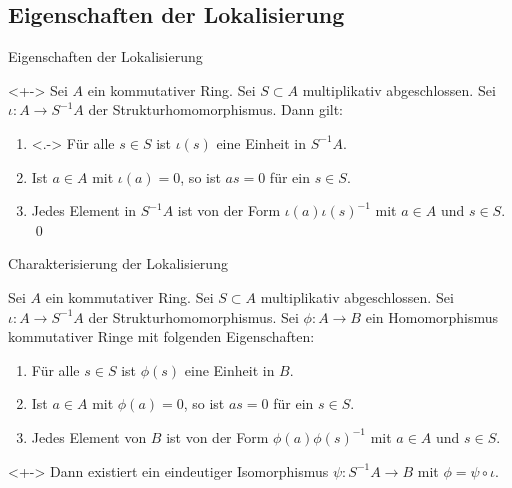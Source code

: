\subsection{Eigenschaften der Lokalisierung}

\begin{frame}{Eigenschaften der Lokalisierung}
	\begin{proposition}<+->
		Sei \(A\) ein kommutativer Ring. Sei \(S \subset A\) multiplikativ abgeschlossen. Sei \(\iota\colon A \to S^{-1} A\)
		der Strukturhomomorphismus. Dann gilt:
		\begin{enumerate}[<+->]
		\item<.->
			Für alle \(s \in S\) ist \(\iota(s)\) eine Einheit in \(S^{-1} A\).
		\item
			Ist \(a \in A\) mit \(\iota(a) = 0\), so ist \(a s = 0\) für ein \(s \in S\).
		\item
			Jedes Element in \(S^{-1} A\) ist von der Form \(\iota(a) \iota(s)^{-1}\) mit \(a \in A\) und \(s \in S\).
			\qed
		\end{enumerate}
	\end{proposition}
\end{frame}

\begin{frame}{Charakterisierung der Lokalisierung}
	\begin{corollary}
		Sei \(A\) ein kommutativer Ring. Sei \(S \subset A\) multiplikativ abgeschlossen.
		Sei \(\iota\colon A \to S^{-1} A\) der Strukturhomomorphismus.
		Sei \(\phi\colon A \to B\) ein Homomorphismus kommutativer Ringe mit folgenden Eigenschaften:
		\begin{enumerate}[<+->]
		\item
			Für alle \(s \in S\) ist \(\phi(s)\) eine Einheit in \(B\).
		\item
			Ist \(a \in A\) mit \(\phi(a) = 0\), so ist \(a s = 0\) für ein \(s \in S\).
		\item
			Jedes Element von \(B\) ist von der Form \(\phi(a) \phi(s)^{-1}\) mit \(a \in A\) und \(s \in S\).
		\end{enumerate}
		\begin{visibleenv}<+->
			Dann existiert ein eindeutiger Isomorphismus \(\psi\colon S^{-1} A \to B\) mit \(\phi = \psi \circ \iota\).
		\end{visibleenv}
	\end{corollary}
\end{frame}

